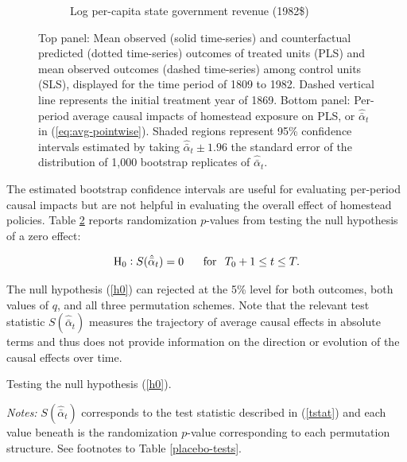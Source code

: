 \documentclass[12pt]{article}
\begin{document}
\begin{figure}[htbp]
\begin{subfigure}[t]{0.75\textwidth}
		\caption{Log per-capita state government revenue (1982\$)\label{mc-estimates-rev-pc}}
	\end{subfigure}
	\caption{Top panel: Mean observed (solid time-series) and counterfactual predicted (dotted time-series) outcomes of treated units (PLS) and mean observed outcomes (dashed time-series) among control units (SLS), displayed for the time period of 1809 to 1982. Dashed vertical line represents the initial treatment year of 1869. Bottom panel: Per-period average causal impacts of homestead exposure on PLS, or $\hat{\bar{\alpha}}_{t}$ in (\ref{eq:avg-pointwise}). Shaded regions represent 95\% confidence intervals estimated by taking $\hat{\bar{\alpha}}_{t} \pm 1.96$ the standard error of the distribution of 1,000 bootstrap replicates of $\hat{\bar{\alpha}}_{t}$.\label{mc-estimates}} 
\end{figure}

The estimated bootstrap confidence intervals are useful for evaluating per-period causal impacts but are not helpful in evaluating the overall effect of homestead policies. Table \ref{mc-estimates} reports randomization $p$-values from testing the null hypothesis of a zero effect:

\begin{equation} \label{h0}
\text{H}_0: S (\hat{\bar{\alpha}}_{t}) = 0  \, \hspace{5mm} \,  \text{for} \, \hspace{2mm} T_0 + 1 \leq t \leq T.
\end{equation}
\noindent

The null hypothesis (\ref{h0}) can rejected at the 5\% level for both outcomes, both values of $q$, and all three permutation schemes. Note that the relevant test statistic $S (\hat{\bar{\alpha}}_{t})$ measures the trajectory of average causal effects in absolute terms and thus does not provide information on the direction or evolution of the causal effects over time. %

\begin{table}[htbp]
	\captionsetup{font=normalsize}
	\caption{Testing the null hypothesis (\ref{h0}).\label{mc-estimates}}
	\begin{center}
		
	\end{center}
	\footnotesize{\emph{Notes:} $S (\hat{\bar{\alpha}}_{t})$ corresponds to the test statistic described in (\ref{tstat}) and each value beneath is the randomization $p$-value corresponding to each permutation structure. See footnotes to Table \ref{placebo-tests}.}
\end{table}
\end{document}

